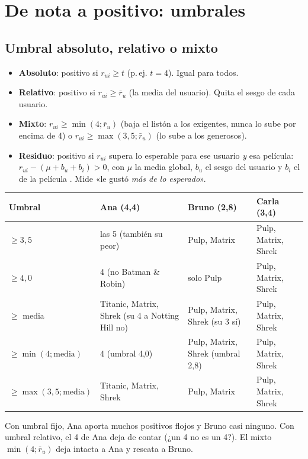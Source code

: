 \documentclass[a4paper,11pt]{article}
\begin{document}
\section{De nota a positivo: umbrales}

\subsection{Umbral absoluto, relativo o mixto}
\begin{itemize}
  \item \textbf{Absoluto}: positivo si $r_{ui}\ge t$ (p.\,ej. $t=4$). Igual para todos.
  \item \textbf{Relativo}: positivo si $r_{ui}\ge \bar r_u$ (la media del usuario). Quita el sesgo de cada usuario.
  \item \textbf{Mixto}: $r_{ui}\ge\min(4;\bar r_u)$ (baja el listón a los exigentes, nunca lo sube por encima de 4)
        o $r_{ui}\ge\max(3{,}5;\bar r_u)$ (lo sube a los generosos).
  \item \textbf{Residuo}: positivo si $r_{ui}$ supera lo esperable para ese usuario \emph{y} esa película:
        $r_{ui}-(\mu+b_u+b_i)>0$, con $\mu$ la media global, $b_u$ el sesgo del usuario y $b_i$ el de la película
        \cite{koren2009}. Mide «le gustó \emph{más de lo esperado}».
\end{itemize}

\begin{ejemplo}
\begin{center}
\begin{tabularx}{\linewidth}{lYYY}
\toprule
Umbral & Ana (4,4) & Bruno (2,8) & Carla (3,4) \\
\midrule
$\ge 3{,}5$ & las 5 (también su peor) & Pulp, Matrix & Pulp, Matrix, Shrek \\
$\ge 4{,}0$ & 4 (no Batman \& Robin) & solo Pulp & Pulp, Matrix, Shrek \\
$\ge$ media & Titanic, Matrix, Shrek (su 4 a Notting Hill no) & Pulp, Matrix, Shrek (su 3 sí) & Pulp, Matrix, Shrek \\
$\ge\min(4;\text{media})$ & 4 (umbral 4,0) & Pulp, Matrix, Shrek (umbral 2,8) & Pulp, Matrix, Shrek \\
$\ge\max(3{,}5;\text{media})$ & Titanic, Matrix, Shrek & Pulp, Matrix & Pulp, Matrix, Shrek \\
\bottomrule
\end{tabularx}
\end{center}
Con umbral fijo, Ana aporta muchos positivos flojos y Bruno casi ninguno. Con umbral relativo, el 4 de Ana deja de
contar (¿un 4 no es un 4?). El mixto $\min(4;\bar r_u)$ deja intacta a Ana y rescata a Bruno.
\end{ejemplo}
\end{document}
